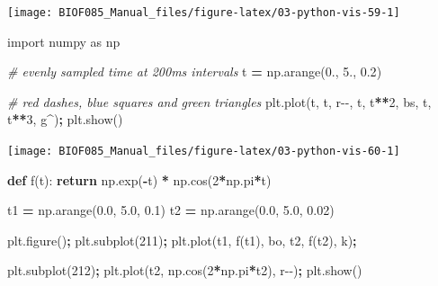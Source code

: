 \documentclass[
  letterpaper,
]{scrbook}
\newenvironment{Shaded}{\begin{snugshade}}{\end{snugshade}}
\newcommand{\CommentTok}[1]{\textcolor[rgb]{0.56,0.35,0.01}{\textit{#1}}}
\newcommand{\ControlFlowTok}[1]{\textcolor[rgb]{0.13,0.29,0.53}{\textbf{#1}}}
\newcommand{\DecValTok}[1]{\textcolor[rgb]{0.00,0.00,0.81}{#1}}
\newcommand{\FloatTok}[1]{\textcolor[rgb]{0.00,0.00,0.81}{#1}}
\newcommand{\ImportTok}[1]{#1}
\newcommand{\KeywordTok}[1]{\textcolor[rgb]{0.13,0.29,0.53}{\textbf{#1}}}
\newcommand{\NormalTok}[1]{#1}
\newcommand{\OperatorTok}[1]{\textcolor[rgb]{0.81,0.36,0.00}{\textbf{#1}}}
\newcommand{\StringTok}[1]{\textcolor[rgb]{0.31,0.60,0.02}{#1}}
\begin{document}
\begin{center}\texttt{[image: BIOF085\_Manual\_files/figure-latex/03-python-vis-59-1]} \end{center}

\begin{Shaded}
\begin{Highlighting}[]
\ImportTok{import}\NormalTok{ numpy }\ImportTok{as}\NormalTok{ np}

\CommentTok{\# evenly sampled time at 200ms intervals}
\NormalTok{t }\OperatorTok{=}\NormalTok{ np.arange(}\FloatTok{0.}\NormalTok{, }\FloatTok{5.}\NormalTok{, }\FloatTok{0.2}\NormalTok{)}

\CommentTok{\# red dashes, blue squares and green triangles}
\NormalTok{plt.plot(t, t, }\StringTok{\textquotesingle{}r{-}{-}\textquotesingle{}}\NormalTok{, t, t}\OperatorTok{**}\DecValTok{2}\NormalTok{, }\StringTok{\textquotesingle{}bs\textquotesingle{}}\NormalTok{, t, t}\OperatorTok{**}\DecValTok{3}\NormalTok{, }\StringTok{\textquotesingle{}g\^{}\textquotesingle{}}\NormalTok{)}\OperatorTok{;}
\NormalTok{plt.show()}
\end{Highlighting}
\end{Shaded}

\begin{center}\texttt{[image: BIOF085\_Manual\_files/figure-latex/03-python-vis-60-1]} \end{center}

\begin{Shaded}
\begin{Highlighting}[]
\KeywordTok{def}\NormalTok{ f(t):}
    \ControlFlowTok{return}\NormalTok{ np.exp(}\OperatorTok{{-}}\NormalTok{t) }\OperatorTok{*}\NormalTok{ np.cos(}\DecValTok{2}\OperatorTok{*}\NormalTok{np.pi}\OperatorTok{*}\NormalTok{t)}

\NormalTok{t1 }\OperatorTok{=}\NormalTok{ np.arange(}\FloatTok{0.0}\NormalTok{, }\FloatTok{5.0}\NormalTok{, }\FloatTok{0.1}\NormalTok{)}
\NormalTok{t2 }\OperatorTok{=}\NormalTok{ np.arange(}\FloatTok{0.0}\NormalTok{, }\FloatTok{5.0}\NormalTok{, }\FloatTok{0.02}\NormalTok{)}

\NormalTok{plt.figure()}\OperatorTok{;}
\NormalTok{plt.subplot(}\DecValTok{211}\NormalTok{)}\OperatorTok{;}
\NormalTok{plt.plot(t1, f(t1), }\StringTok{\textquotesingle{}bo\textquotesingle{}}\NormalTok{, t2, f(t2), }\StringTok{\textquotesingle{}k\textquotesingle{}}\NormalTok{)}\OperatorTok{;}

\NormalTok{plt.subplot(}\DecValTok{212}\NormalTok{)}\OperatorTok{;}
\NormalTok{plt.plot(t2, np.cos(}\DecValTok{2}\OperatorTok{*}\NormalTok{np.pi}\OperatorTok{*}\NormalTok{t2), }\StringTok{\textquotesingle{}r{-}{-}\textquotesingle{}}\NormalTok{)}\OperatorTok{;}
\NormalTok{plt.show()}
\end{Highlighting}
\end{Shaded}
\end{document}
